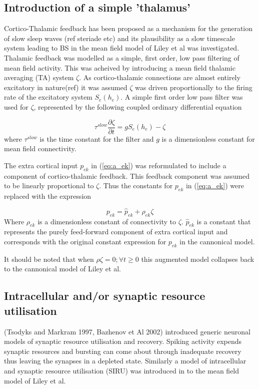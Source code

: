 \documentclass[a4paper,12pt]{article}
\begin{document}
\subsection{Introduction of a simple 'thalamus'}

Cortico-Thalamic feedback has been proposed as a mechanism for the generation of slow sleep waves (ref steriade etc) and its plausibility as a slow timescale system leading to BS in the mean field model of Liley et al was investigated. Thalamic feedback was modelled as a simple, first order, low pass filtering of mean field activity. This was acheived by introducing a mean field  thalamic averaging (TA) system $\zeta$. As cortico-thalamic connections are almost entirely excitatory in nature(ref) it was assumed $\zeta$ was driven proportionally to the firing rate of the excitatory system $S_e(h_e)$.
A simple first order low pass filter was used for $\zeta$, represented by the following coupled ordinary differential equation

\begin{equation} \label{eq:zeta_slow} 
\tau^{slow} \frac{\partial \zeta}{\partial t} = g S_e(h_e) - \zeta
\end{equation}
where $\tau^{slow}$ is the time constant for the filter and $g$ is a dimensionless constant for mean field connectivity.

The extra cortical input $p_{ek}$ in (\ref{eq:a_ek}) was reformulated to include a component of cortico-thalamic feedback. This feedback component was assumed to be linearly proportional to $\zeta$. Thus the constants for $p_{ek}$ in (\ref{eq:a_ek}) were replaced with the expression

\begin{equation} \label{eq:p_ek}
p_{ek} = \hat{p}_{ek} + \rho_{ek} \zeta
\end{equation}
\noindent
Where $\rho_{ek}$ is a dimensionless constant of connectivity to $\zeta$. $\hat{p}_{ek}$ is a constant that represents
the purely feed-forward component of extra cortical input and corresponds with the original constant expression for $p_{ek}$ in the cannonical model. 

It should be noted that when $\rho\zeta=0; \forall t \geq 0$ this augmented model collapses back to the cannonical model of Liley et al.

\subsection{Intracellular and/or synaptic resource utilisation}
(Tsodyks and Markram 1997, Bazhenov et Al 2002) introduced generic neuronal models of synaptic resource utilisation and recovery. Spiking activity expends synaptic resources and bursting can come about through inadequate recovery thus leaving the synapses in a depleted state.  Similarly a model of intracellular and synaptic resource utilisation (SIRU) was introduced in to the mean field model of Liley et al. 
\end{document}
